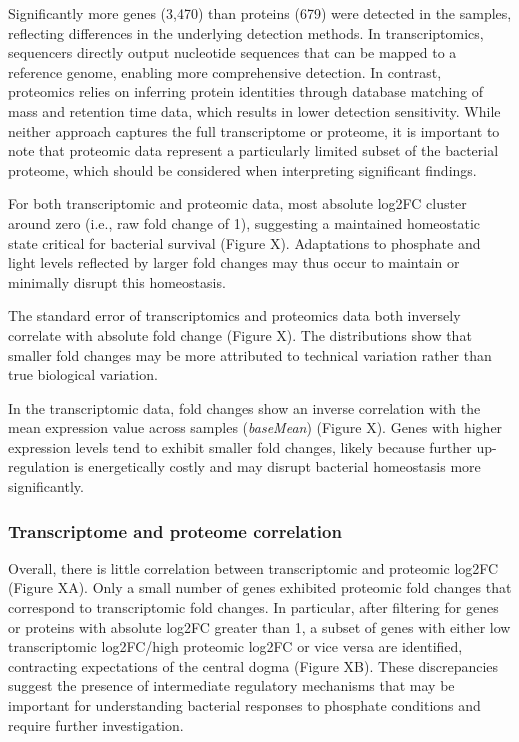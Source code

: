 Significantly more genes (3,470) than proteins (679) were detected in
the samples, reflecting differences in the underlying detection methods.
In transcriptomics, sequencers directly output nucleotide sequences that
can be mapped to a reference genome, enabling more comprehensive
detection. In contrast, proteomics relies on inferring protein
identities through database matching of mass and retention time data,
which results in lower detection sensitivity. While neither approach
captures the full transcriptome or proteome, it is important to note
that proteomic data represent a particularly limited subset of the
bacterial proteome, which should be considered when interpreting
significant findings.

For both transcriptomic and proteomic data, most absolute log2FC cluster
around zero (i.e., raw fold change of 1), suggesting a maintained
homeostatic state critical for bacterial survival (Figure X).
Adaptations to phosphate and light levels reflected by larger fold
changes may thus occur to maintain or minimally disrupt this
homeostasis.

The standard error of transcriptomics and proteomics data both inversely
correlate with absolute fold change (Figure X). The distributions show
that smaller fold changes may be more attributed to technical variation
rather than true biological variation.

In the transcriptomic data, fold changes show an inverse correlation
with the mean expression value across samples (\emph{baseMean}) (Figure
X). Genes with higher expression levels tend to exhibit smaller fold
changes, likely because further up-regulation is energetically costly
and may disrupt bacterial homeostasis more significantly.

\subsubsection{Transcriptome and proteome
correlation}\label{transcriptome-and-proteome-correlation}

Overall, there is little correlation between transcriptomic and
proteomic log2FC (Figure XA). Only a small number of genes exhibited
proteomic fold changes that correspond to transcriptomic fold changes.
In particular, after filtering for genes or proteins with absolute
log2FC greater than 1, a subset of genes with either low transcriptomic
log2FC/high proteomic log2FC or vice versa are identified, contracting
expectations of the central dogma (Figure XB). These discrepancies
suggest the presence of intermediate regulatory mechanisms that may be
important for understanding bacterial responses to phosphate conditions
and require further investigation.

